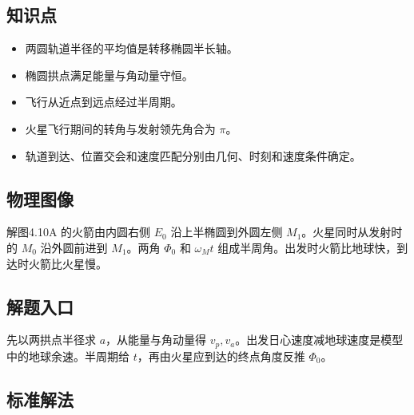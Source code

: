 \documentclass[UTF8,fontset=fandol,a4paper,11pt]{ctexart}
\begin{document}


\subsection*{知识点}

\begin{itemize}
\item 两圆轨道半径的平均值是转移椭圆半长轴。
\item 椭圆拱点满足能量与角动量守恒。
\item 飞行从近点到远点经过半周期。
\item 火星飞行期间的转角与发射领先角合为 $\pi$。
\item 轨道到达、位置交会和速度匹配分别由几何、时刻和速度条件确定。
\end{itemize}




\subsection*{物理图像}

解图4.10A 的火箭由内圆右侧 $E_0$ 沿上半椭圆到外圆左侧 $M_1$。火星同时从发射时的 $M_0$ 沿外圆前进到 $M_1$。两角 $\Phi_0$ 和 $\omega_Mt$ 组成半周角。出发时火箭比地球快，到达时火箭比火星慢。



\subsection*{解题入口}

先以两拱点半径求 $a$，从能量与角动量得 $v_p,v_a$。出发日心速度减地球速度是模型中的地球余速。半周期给 $t$，再由火星应到达的终点角度反推 $\Phi_0$。



\subsection*{标准解法}
\end{document}
